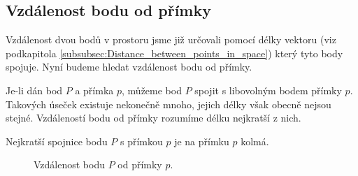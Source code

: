 \subsection{Vzdálenost bodu od přímky}
\label{subsec:Distance_point_line_space}

Vzdálenost dvou bodů v prostoru jsme již určovali pomocí délky
vektoru (viz podkapitola \ref{subsubsec:Distance_between_points_in_space}) který tyto body spojuje. Nyní budeme hledat vzdálenost bodu
od přímky.

Je-li dán bod $P$ a přímka $p$, můžeme bod $P$ spojit s libovolným
bodem přímky $p$. Takových úseček existuje nekonečně mnoho, jejich
délky však obecně nejsou stejné. Vzdáleností bodu od přímky rozumíme
délku nejkratší z nich.

Nejkratší spojnice bodu $P$ s přímkou $p$ je na přímku $p$ kolmá.

\begin{figure}[H]
    \centering
    \caption{Vzdálenost bodu $P$ od přímky $p$.}
    \label{fig:Distance_point_line_space}
\end{figure}

